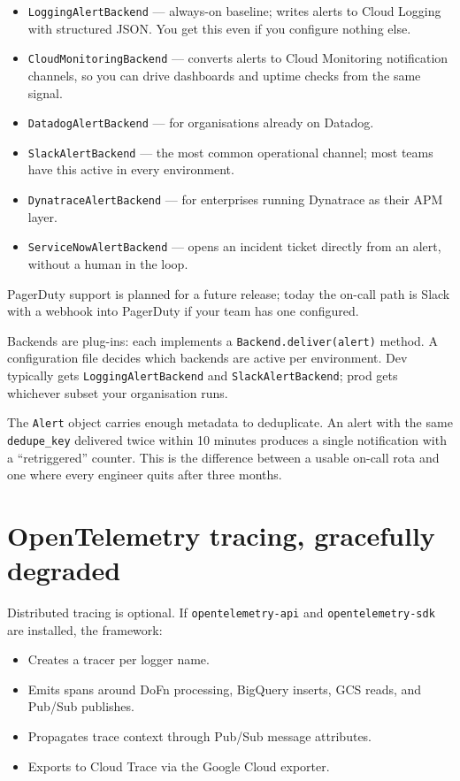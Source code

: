 \documentclass[
  11pt,
  british,
  oneside]{book}
\providecommand{\tightlist}{%
  \setlength{\itemsep}{0pt}\setlength{\parskip}{0pt}}
\begin{document}
\begin{itemize}
\tightlist
\item
  \texttt{LoggingAlertBackend} --- always-on baseline; writes alerts to
  Cloud Logging with structured JSON. You get this even if you configure
  nothing else.
\item
  \texttt{CloudMonitoringBackend} --- converts alerts to Cloud
  Monitoring notification channels, so you can drive dashboards and
  uptime checks from the same signal.
\item
  \texttt{DatadogAlertBackend} --- for organisations already on Datadog.
\item
  \texttt{SlackAlertBackend} --- the most common operational channel;
  most teams have this active in every environment.
\item
  \texttt{DynatraceAlertBackend} --- for enterprises running Dynatrace
  as their APM layer.
\item
  \texttt{ServiceNowAlertBackend} --- opens an incident ticket directly
  from an alert, without a human in the loop.
\end{itemize}

PagerDuty support is planned for a future release; today the on-call
path is Slack with a webhook into PagerDuty if your team has one
configured.

Backends are plug-ins: each implements a \texttt{Backend.deliver(alert)}
method. A configuration file decides which backends are active per
environment. Dev typically gets \texttt{LoggingAlertBackend} and
\texttt{SlackAlertBackend}; prod gets whichever subset your organisation
runs.

The \texttt{Alert} object carries enough metadata to deduplicate. An
alert with the same \texttt{dedupe\_key} delivered twice within 10
minutes produces a single notification with a ``retriggered'' counter.
This is the difference between a usable on-call rota and one where every
engineer quits after three months.

\hypertarget{opentelemetry-tracing-gracefully-degraded}{%
\section{OpenTelemetry tracing, gracefully
degraded}\label{opentelemetry-tracing-gracefully-degraded}}

Distributed tracing is optional. If
\texttt{opentelemetry-api} and \texttt{opentelemetry-sdk} are installed,
the framework:

\begin{itemize}
\tightlist
\item
  Creates a tracer per logger name.
\item
  Emits spans around DoFn processing, BigQuery inserts, GCS reads, and
  Pub/Sub publishes.
\item
  Propagates trace context through Pub/Sub message attributes.
\item
  Exports to Cloud Trace via the Google Cloud exporter.
\end{itemize}
\end{document}
